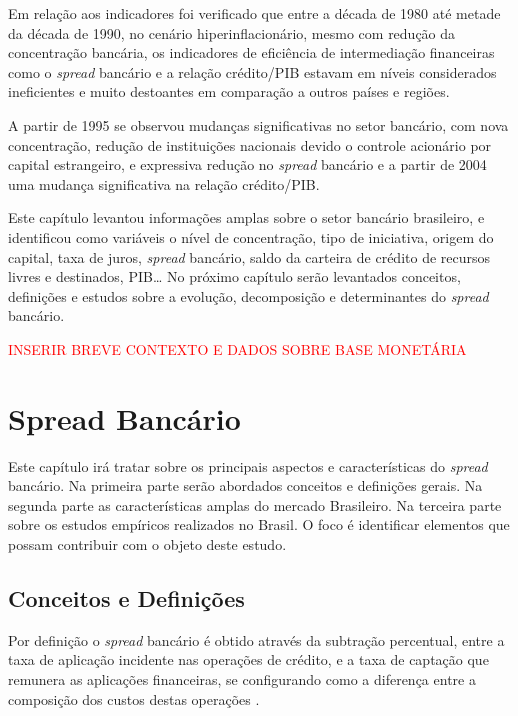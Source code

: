\documentclass[12pt,openright,oneside,a4paper,chapter=TITLE,section=TITLE,subsection=TITLE,english,french,spanish,portugues,sumario=tradicional]{04-class-files/abntex2}
\begin{document}
Em relação aos indicadores foi verificado que entre a década de 1980 até metade
da década de 1990, no cenário hiperinflacionário, mesmo com redução da
concentração bancária, os indicadores de eficiência de intermediação
financeiras como o \emph{spread} bancário e a relação crédito/PIB estavam em níveis
considerados ineficientes e muito destoantes em comparação a outros países e
regiões.

A partir de 1995 se observou mudanças significativas no setor bancário, com
nova concentração, redução de instituições nacionais devido o controle
acionário por capital estrangeiro, e expressiva redução no \emph{spread} bancário e
a partir de 2004 uma mudança significativa na relação crédito/PIB.

Este capítulo levantou informações amplas sobre o setor bancário brasileiro, e
identificou como variáveis o nível de concentração, tipo de iniciativa, origem
do capital, taxa de juros, \emph{spread} bancário, saldo da carteira de crédito de
recursos livres e destinados, PIB\ldots{} No próximo capítulo serão levantados
conceitos, definições e estudos sobre a evolução, decomposição e determinantes
do \emph{spread} bancário.

\textcolor{red}{INSERIR BREVE CONTEXTO E DADOS SOBRE BASE MONETÁRIA}

\textual
\pagestyle{simple}

\section{Spread Bancário}

Este capítulo irá tratar sobre os principais aspectos e características do
\emph{spread} bancário. Na primeira parte serão abordados conceitos e definições
gerais. Na segunda parte as características amplas do mercado Brasileiro. Na
terceira parte sobre os estudos empíricos realizados no Brasil. O foco é
identificar elementos que possam contribuir com o objeto deste estudo.

\subsection{Conceitos e Definições}

Por definição o \emph{spread} bancário é obtido através da subtração percentual,
entre a taxa de aplicação incidente nas operações de crédito, e a taxa de
captação que remunera as aplicações financeiras, se configurando como a
diferença entre a composição dos custos destas operações \cite{BCB:2000}.
\end{document}
